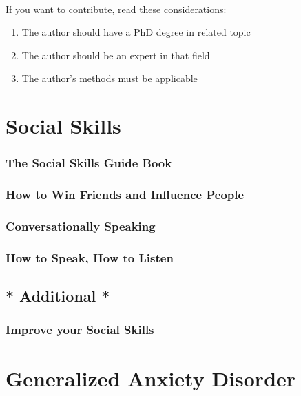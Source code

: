 \documentclass[12pt, a4paper]{article}
\newcommand{\nl}{\vspace{\baselineskip}}
\begin{document}
\newpage

\begin{large}
\paragraph{}
If you want to contribute, read these considerations:

\begin{enumerate}

\item The author should have a PhD degree in related topic
\item The author should be an expert in that field
\item The author's methods must be applicable

\end{enumerate}

\end{large}

\newpage

\section*{Social Skills}
\subsubsection*{The Social Skills Guide Book}
\subsubsection*{How to Win Friends and Influence People}
\subsubsection*{Conversationally Speaking}
\subsubsection*{How to Speak, How to Listen}\nl
\subsection*{* Additional *}
\subsubsection*{Improve your Social Skills}\nl


\section*{Generalized Anxiety Disorder}
\end{document}
